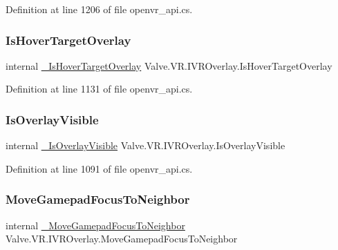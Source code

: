 Definition at line 1206 of file openvr\+\_\+api.\+cs.

\mbox{\label{struct_valve_1_1_v_r_1_1_i_v_r_overlay_a45ae0e59b0f2c9ba8ea83ac22c984564}} 
\subsubsection{\texorpdfstring{IsHoverTargetOverlay}{IsHoverTargetOverlay}}
{\footnotesize\ttfamily internal \mbox{\hyperlink{struct_valve_1_1_v_r_1_1_i_v_r_overlay_a1590850cc22c3398e21bdeff4eb15bbe}{\+\_\+\+Is\+Hover\+Target\+Overlay}} Valve.\+V\+R.\+I\+V\+R\+Overlay.\+Is\+Hover\+Target\+Overlay}



Definition at line 1131 of file openvr\+\_\+api.\+cs.

\mbox{\label{struct_valve_1_1_v_r_1_1_i_v_r_overlay_a7f59db024e5aadf826774c610e15a888}} 
\subsubsection{\texorpdfstring{IsOverlayVisible}{IsOverlayVisible}}
{\footnotesize\ttfamily internal \mbox{\hyperlink{struct_valve_1_1_v_r_1_1_i_v_r_overlay_afc7823ac1ca911ba5de47113a72d3930}{\+\_\+\+Is\+Overlay\+Visible}} Valve.\+V\+R.\+I\+V\+R\+Overlay.\+Is\+Overlay\+Visible}



Definition at line 1091 of file openvr\+\_\+api.\+cs.

\mbox{\label{struct_valve_1_1_v_r_1_1_i_v_r_overlay_a4da6762b75768a1b0d29ec4b2758bfd3}} 
\subsubsection{\texorpdfstring{MoveGamepadFocusToNeighbor}{MoveGamepadFocusToNeighbor}}
{\footnotesize\ttfamily internal \mbox{\hyperlink{struct_valve_1_1_v_r_1_1_i_v_r_overlay_ae3ae1992c75afb63050b87c2e2c8bc48}{\+\_\+\+Move\+Gamepad\+Focus\+To\+Neighbor}} Valve.\+V\+R.\+I\+V\+R\+Overlay.\+Move\+Gamepad\+Focus\+To\+Neighbor}



